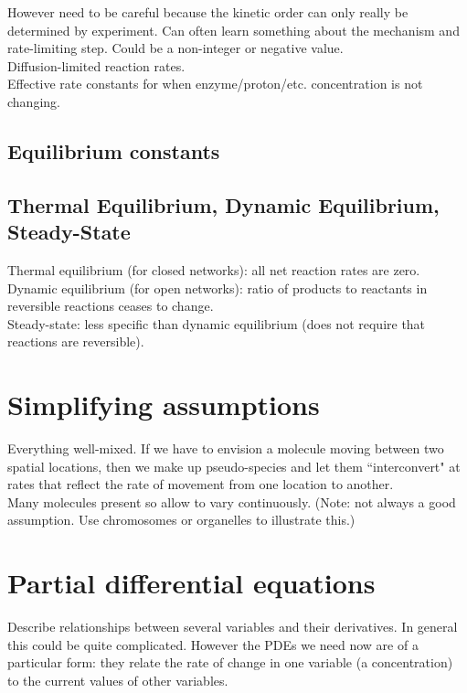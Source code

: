 \documentclass{article}
\begin{document}
However need to be careful because the kinetic order can only really be determined by experiment. Can often learn something about the mechanism and rate-limiting step. Could be a non-integer or negative value.\\

Diffusion-limited reaction rates.\\

Effective rate constants for when enzyme/proton/etc. concentration is not changing.

\subsection*{Equilibrium constants}

\subsection*{Thermal Equilibrium, Dynamic Equilibrium, Steady-State}

Thermal equilibrium (for closed networks): all net reaction rates are zero.\\

Dynamic equilibrium (for open networks): ratio of products to reactants in reversible reactions ceases to change.\\

Steady-state: less specific than dynamic equilibrium (does not require that reactions are reversible).

\section*{Simplifying assumptions}
Everything well-mixed. If we have to envision a molecule moving between two spatial locations, then we make up pseudo-species and let them ``interconvert" at rates that reflect the rate of movement from one location to another.\\

Many molecules present so allow to vary continuously. (Note: not always a good assumption. Use chromosomes or organelles to illustrate this.)\\

\section*{Partial differential equations}

Describe relationships between several variables and their derivatives. In general this could be quite complicated. However the PDEs we need now are of a particular form: they relate the rate of change in one variable (a concentration) to the current values of other variables.\\
\end{document}
